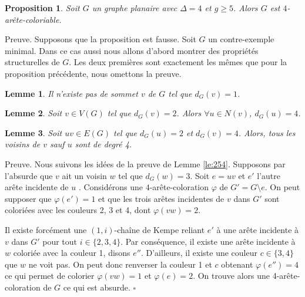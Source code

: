 \documentclass[10pt,a4paper]{article}
\newtheorem{proposition}{Proposition}
\newtheorem{lemme}{Lemme}
\newcommand{\ep}{{\hfill $\square$}}
\begin{document}

\begin{proposition}
Soit $G$ un graphe planaire avec $\Delta = 4$ et $g \geq 5$. Alors $G$ est $4$-arête-coloriable.
\end{proposition}

Preuve. Supposons que la proposition est fausse. Soit $G$ un contre-exemple minimal. Dans ce cas aussi nous allons d'abord montrer des propriétés structurelles de $G$. Les deux premières sont exactement les mêmes que pour la proposition précédente, nous omettons la preuve.

\begin{lemme}
Il n'existe pas de sommet $v$ de $G$ tel que $d_G(v) = 1$.
\label{le:14}
\end{lemme}

\begin{lemme}
Soit $v \in V(G)$ tel que $d_G(v) = 2$. Alors $\forall u \in N(v)$, $d_G(u) = 4$.
\label{le:23}
\end{lemme} 

\begin{lemme}
Soit $uv \in E(G)$ tel que $d_G(u) = 2$ et $d_G(v) = 4$. Alors, tous les voisins de $v$ sauf $u$ sont de degré 4.
\label{le:243}
\end{lemme}

Preuve. Nous suivons les idées de la preuve de Lemme \ref{le:254}.
Supposons par l'absurde que $v$ ait un voisin $w$ tel que $d_G(w) = 3$. Soit $e = uv$ et $e'$ l'autre arête incidente de $u$ . Considérons une $4$-arête-coloration $\varphi$ de $G' = G \setminus e$. On peut supposer que $\varphi(e') = 1$ et que les trois arêtes incidentes de $v$ dans $G'$ sont coloriées avec les couleurs 2, 3 et 4, dont $\varphi(vw) = 2$. 

Il existe forcément une $(1,i)$-chaîne de Kempe reliant $e'$ à une arête incidente à $v$ dans $G'$ pour tout $i \in \{2,3,4\}$. Par conséquence, il existe une arête incidente à $w$ coloriée avec la couleur 1, disons $e''$. D'ailleurs, il existe une couleur $c\in \{3,4\}$ que $w$ ne voit pas. On peut donc renverser la couleur 1 et $c$ obtenant $\varphi(e'') = 4$ ce qui permet de colorier $\varphi(vw) = 1$ et $\varphi(e) = 2$. On trouve alors une 4-arête-coloration de $G$ ce qui est absurde.
\ep
\end{document}
